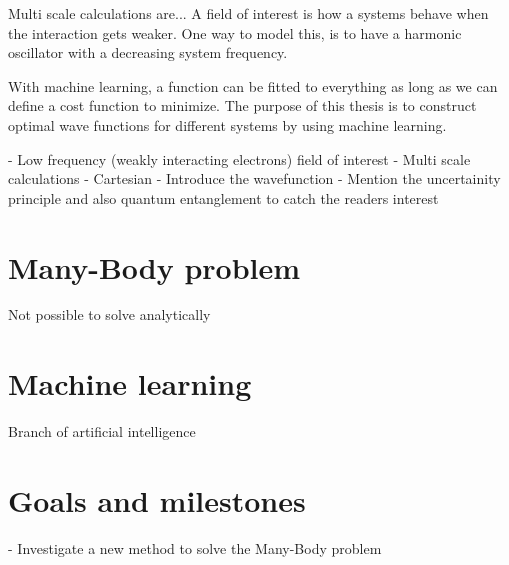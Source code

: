 Multi scale calculations are... A field of interest is how a systems behave when the interaction gets weaker. One way to model this, is to have a harmonic oscillator with a decreasing system frequency. 

With machine learning, a function can be fitted to everything as long as we can define a cost function to minimize. The purpose of this thesis is to construct optimal wave functions for different systems by using machine learning.

 - Low frequency (weakly interacting electrons) field of interest
 - Multi scale calculations
 - Cartesian
 - Introduce the wavefunction
 - Mention the uncertainity principle and also quantum entanglement to catch the readers interest
 
 
\section{Many-Body problem} \label{subsec:manybodyproblem}
Not possible to solve analytically

\section{Machine learning} \label{subsec:machinelearning}
Branch of artificial intelligence

\section{Goals and milestones} \label{subsec:goals}
- Investigate a new method to solve the Many-Body problem